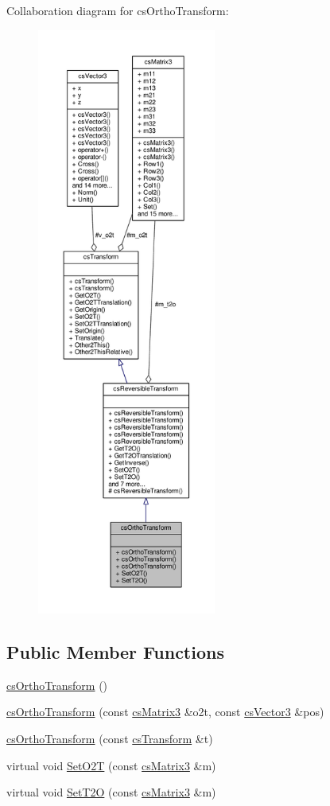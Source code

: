 Collaboration diagram for cs\+Ortho\+Transform\+:
\nopagebreak
\begin{figure}[H]
\begin{center}
\leavevmode
\includegraphics[height=550pt]{d6/db6/classcsOrthoTransform__coll__graph}
\end{center}
\end{figure}
\subsection*{Public Member Functions}
\begin{DoxyCompactItemize}
\item 
\hyperlink{classcsOrthoTransform_a21956bd7babb5be7864b4b0c8da3c3bc}{cs\+Ortho\+Transform} ()
\item 
\hyperlink{classcsOrthoTransform_add19421188e21e7e33303d70a5658edb}{cs\+Ortho\+Transform} (const \hyperlink{classcsMatrix3}{cs\+Matrix3} \&o2t, const \hyperlink{classcsVector3}{cs\+Vector3} \&pos)
\item 
\hyperlink{classcsOrthoTransform_a6c4d9be981e5487d02baa4015fd2d748}{cs\+Ortho\+Transform} (const \hyperlink{classcsTransform}{cs\+Transform} \&t)
\item 
virtual void \hyperlink{classcsOrthoTransform_a2c075ede84fdeddac05480eb5a39b85d}{Set\+O2T} (const \hyperlink{classcsMatrix3}{cs\+Matrix3} \&m)
\item 
virtual void \hyperlink{classcsOrthoTransform_a851a3ee657be77e99ba8b926f837eeed}{Set\+T2O} (const \hyperlink{classcsMatrix3}{cs\+Matrix3} \&m)
\end{DoxyCompactItemize}
